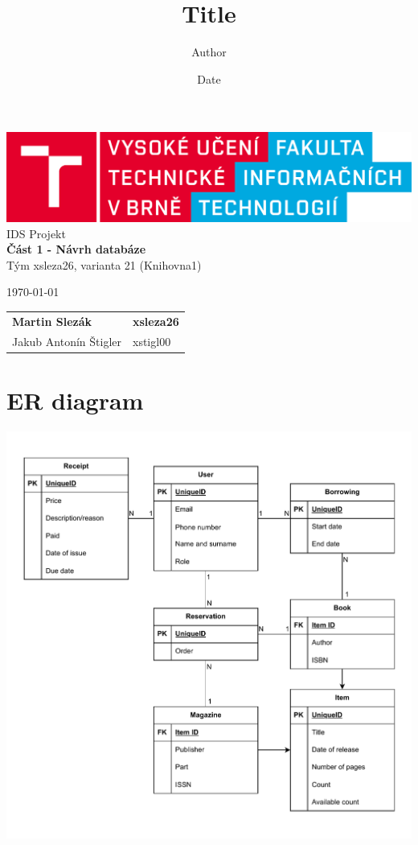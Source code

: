 \documentclass{article}
\title{Title}
\author{Author}
\date{Date}
\begin{document}
\begin{titlepage}
    \begin{center}
        \includegraphics[width=1\textwidth]{assets/FIT_logo.png} \\
        \Huge{IDS Projekt} \\
        \Large{\textbf{Část 1 - Návrh databáze}} \\
        \large{Tým xsleza26, varianta 21 (Knihovna1)}
    \end{center}
    \vfill
    {
        \large \today \hfill
        \begin{tabular}{l l}
            \textbf{Martin Slezák} & \quad \textbf{xsleza26} \\
            Jakub Antonín Štigler  & \quad xstigl00          \\
        \end{tabular}
    }
\end{titlepage}

\section*{ER diagram}

\includegraphics*[width=1\textwidth]{assets/er.pdf}
\end{document}
